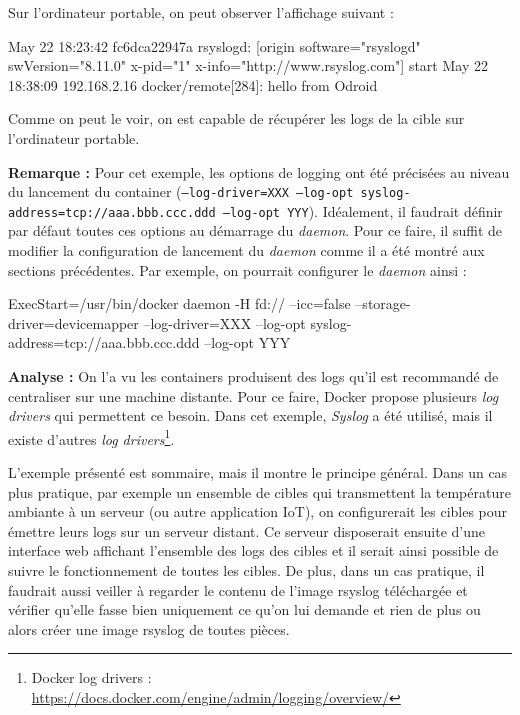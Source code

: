\documentclass[11pt,a4paper,oneside]{report}
\newcommand{\code}[1]{\texttt{#1}}
\begin{document}
Sur l'ordinateur portable, on peut observer l'affichage suivant :
\begin{bashcode}
May 22 18:23:42 fc6dca22947a rsyslogd: [origin software="rsyslogd" swVersion="8.11.0" x-pid="1" x-info="http://www.rsyslog.com"] start
May 22 18:38:09 192.168.2.16 docker/remote[284]: hello from Odroid
\end{bashcode}

Comme on peut le voir, on est capable de récupérer les logs de la cible sur l'ordinateur portable.

\textbf{Remarque : } Pour cet exemple, les options de logging ont été précisées au niveau du lancement du container (\code{--log-driver=XXX --log-opt syslog-address=tcp://aaa.bbb.ccc.ddd --log-opt YYY}). Idéalement, il faudrait définir par défaut toutes ces options au démarrage du \textit{daemon}. Pour ce faire, il suffit de modifier la configuration de lancement du \textit{daemon} comme il a été montré aux sections précédentes. Par exemple, on pourrait configurer le \textit{daemon} ainsi :

\begin{bashcode}
ExecStart=/usr/bin/docker daemon -H fd:// --icc=false --storage-driver=devicemapper --log-driver=XXX --log-opt syslog-address=tcp://aaa.bbb.ccc.ddd --log-opt YYY
\end{bashcode}

\textbf{Analyse : } On l'a vu les containers produisent des logs qu'il est recommandé de centraliser sur une machine distante. Pour ce faire, Docker propose plusieurs \textit{log drivers} qui permettent ce besoin. Dans cet exemple, \textit{Syslog} a été utilisé, mais il existe d'autres \textit{log drivers}\footnote{Docker log drivers : \url{https://docs.docker.com/engine/admin/logging/overview/}}.

L'exemple présenté est sommaire, mais il montre le principe général. Dans un cas plus pratique, par exemple un ensemble de cibles qui transmettent la température ambiante à un serveur (ou autre application IoT), on configurerait les cibles pour émettre leurs logs sur un serveur distant. Ce serveur disposerait ensuite d'une interface web affichant l'ensemble des logs des cibles et il serait ainsi possible de suivre le fonctionnement de toutes les cibles. De plus, dans un cas pratique, il faudrait aussi veiller à regarder le contenu de l'image rsyslog téléchargée et vérifier qu'elle fasse bien uniquement ce qu'on lui demande et rien de plus ou alors créer une image rsyslog de toutes pièces.
\end{document}
